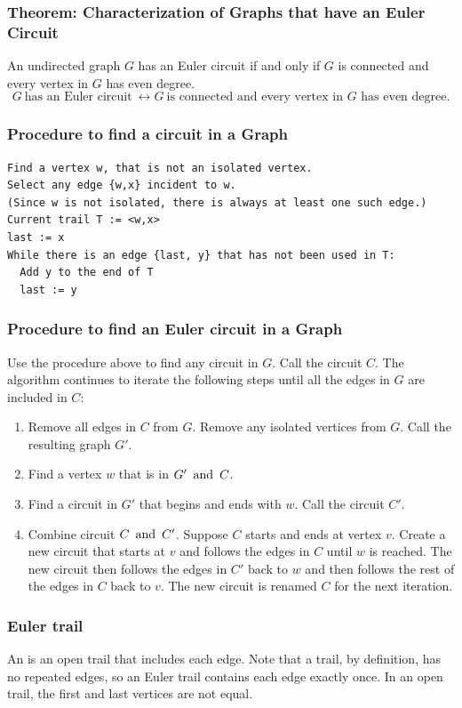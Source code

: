 \subsubsection*{Theorem: Characterization of Graphs that have an Euler Circuit}
An undirected graph $G$ has an Euler circuit if and only if $G$ is connected and every vertex in $G$ has even degree.
\[
  G~\text{has an Euler circuit}~\leftrightarrow G~\text{is connected and every vertex in $G$ has even degree}.
\]

\subsubsection*{Procedure to find a circuit in a Graph}
\begin{lstlisting}
Find a vertex w, that is not an isolated vertex.
Select any edge {w,x} incident to w.
(Since w is not isolated, there is always at least one such edge.)
Current trail T := <w,x>
last := x
While there is an edge {last, y} that has not been used in T:
  Add y to the end of T
  last := y
\end{lstlisting}

\subsubsection*{Procedure to find an Euler circuit in a Graph}
Use the procedure above to find any circuit in $G$. Call the circuit $C$. The algorithm continues to iterate the following steps until all the edges in $G$ are included in $C$:
\begin{enumerate}
  \item Remove all edges in $C$ from $G$. Remove any isolated vertices from $G$. Call the resulting graph $G'$.
  \item Find a vertex $w$ that is in $G' \operatorname{~\text{and}~} C$.
  \item Find a circuit in $G'$ that begins and ends with $w$. Call the circuit $C'$.
  \item Combine circuit $C \operatorname{~\text{and}~} C'$. Suppose $C$ starts and ends at vertex $v$. Create a new circuit that starts at $v$ and follows the edges in $C$ until $w$ is reached. The new circuit then follows the edges in $C'$ back to $w$ and then follows the rest of the edges in $C$ back to $v$. The new circuit is renamed $C$ for the next iteration.
\end{enumerate}


\subsubsection*{Euler trail}
An  is an open trail that includes each edge. Note that a trail, by definition, has no repeated edges, so an Euler trail contains each edge exactly once. In an open trail, the first and last vertices are not equal.

